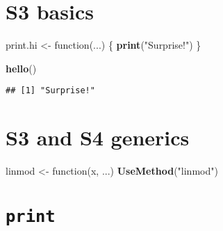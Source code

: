 \documentclass[]{book}
\newenvironment{Shaded}{\begin{snugshade}}{\end{snugshade}}
\newcommand{\KeywordTok}[1]{\textcolor[rgb]{0.13,0.29,0.53}{\textbf{{#1}}}}
\newcommand{\StringTok}[1]{\textcolor[rgb]{0.31,0.60,0.02}{{#1}}}
\newcommand{\NormalTok}[1]{{#1}}
\theoremstyle{definition}
\theoremstyle{definition}
\theoremstyle{definition}
\theoremstyle{remark}
\begin{document}
\section{S3 basics}\label{s3-basics-1}

\begin{Shaded}
\begin{Highlighting}[]
\NormalTok{print.hi <-}\StringTok{ }\NormalTok{function(...) \{}
  \KeywordTok{print}\NormalTok{(}\StringTok{"Surprise!"}\NormalTok{)}
\NormalTok{\}}

\KeywordTok{hello}\NormalTok{()}
\end{Highlighting}
\end{Shaded}

\begin{verbatim}
## [1] "Surprise!"
\end{verbatim}

\section{S3 and S4 generics}\label{s3-and-s4-generics}

\begin{Shaded}
\begin{Highlighting}[]
\NormalTok{linmod <-}\StringTok{ }\NormalTok{function(x, ...)}
  \KeywordTok{UseMethod}\NormalTok{(}\StringTok{"linmod"}\NormalTok{)}
\end{Highlighting}
\end{Shaded}

\begin{Shaded}
\end{Shaded}

\section{\texorpdfstring{\texttt{print}}{print}}\label{print}
\end{document}
